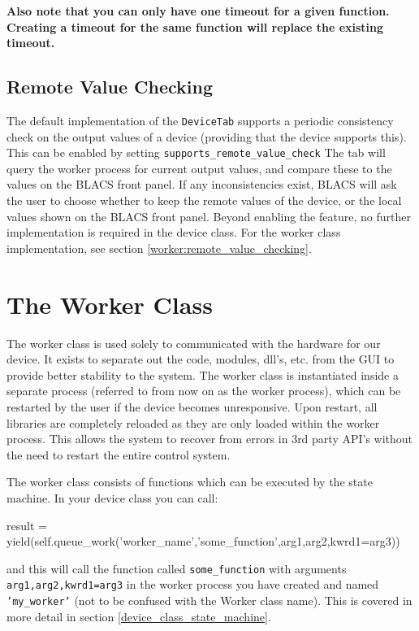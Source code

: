 \documentclass[12pt]{article}
\begin{document}
\textbf{Also note that you can only have one timeout for a given function. Creating a timeout for the same function will replace the existing timeout.}


\subsection{Remote Value Checking}\label{remote_value_checking}
The default implementation of the \texttt{DeviceTab} supports a periodic consistency check on the output values of a device (providing that the device supports this).
This can be enabled by setting \texttt{supports\_remote\_value\_check}
The tab will query the worker process for current output values, and compare these to the values on the BLACS front panel.
If any inconsistencies exist, BLACS will ask the user to choose whether to keep the remote values of the device, or the local values shown on the BLACS front panel.
Beyond enabling the feature, no further implementation is required in the device class.
For the worker class implementation, see section \ref{worker:remote_value_checking}.

\newpage
\section{The Worker Class}
The worker class is used solely to communicated with the hardware for our device. 
It exists to separate out the code, modules, dll's, etc. from the GUI to provide better stability to the system. 
The worker class is instantiated inside a separate process (referred to from now on as the worker process), which can be restarted by the user if the device becomes unresponsive.
Upon restart, all libraries are completely reloaded as they are only loaded within the worker process. 
This allows the system to recover from errors in 3rd party API's without the need to restart the entire control system.

The worker class consists of functions which can be executed by the state machine. 
In your device class you can call:
\begin{python}
result = yield(self.queue_work('worker_name','some_function',arg1,arg2,kwrd1=arg3))
\end{python}
and this will call the function called \texttt{some\_function} with arguments \texttt{arg1,arg2,kwrd1=arg3} in the worker process you have created and named \texttt{'my\_worker'} (not to be confused with the Worker class name). 
This is covered in more detail in section \ref{device_class_state_machine}.
\end{document}

